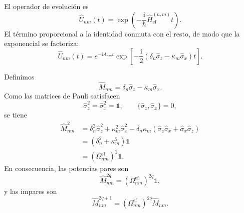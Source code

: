 \documentclass[11pt]{article}
\newcommand{\ii}{\mathrm{i}}
\newcommand{\Id}{\mathds{1}}
\begin{document}
El operador de evoluci\'on es
\begin{equation}
  \hat U_{nm}(t)
  =
  \exp\left(
  -\frac{\ii}{\hbar}
  \hat H_{\mathrm{ef}}^{(n,m)}t
  \right).
\end{equation}
El t\'ermino proporcional a la identidad conmuta con el resto, de modo que la
exponencial se factoriza:
\begin{equation}
  \hat U_{nm}(t)
  =
  e^{-\ii A_{nm}t}
  \exp\left[
  -\frac{\ii}{2}
  \left(
  \delta_n\hat\sigma_z
  -
  \kappa_m\hat\sigma_x
  \right)t
  \right].
\end{equation}

Definimos
\begin{equation}
  \hat M_{nm}
  =
  \delta_n\hat\sigma_z
  -
  \kappa_m\hat\sigma_x.
\end{equation}
Como las matrices de Pauli satisfacen
\begin{equation}
  \hat\sigma_z^2=\hat\sigma_x^2=\Id,
  \qquad
  \{\hat\sigma_z,\hat\sigma_x\}=0,
\end{equation}
se tiene
\begin{equation}
\begin{aligned}
  \hat M_{nm}^2
  &=
  \delta_n^2\hat\sigma_z^2
  +
  \kappa_m^2\hat\sigma_x^2
  -
  \delta_n\kappa_m
  \left(
  \hat\sigma_z\hat\sigma_x
  +
  \hat\sigma_x\hat\sigma_z
  \right)
  \\
  &=
  \left(
  \delta_n^2+\kappa_m^2
  \right)\Id
  \\
  &=
  \left(
  \Omega_{nm}^{\mathrm{ef}}
  \right)^2\Id.
\end{aligned}
\end{equation}
En consecuencia, las potencias pares son
\begin{equation}
  \hat M_{nm}^{2q}
  =
  \left(
  \Omega_{nm}^{\mathrm{ef}}
  \right)^{2q}\Id,
\end{equation}
y las impares son
\begin{equation}
  \hat M_{nm}^{2q+1}
  =
  \left(
  \Omega_{nm}^{\mathrm{ef}}
  \right)^{2q}\hat M_{nm}.
\end{equation}
\end{document}
